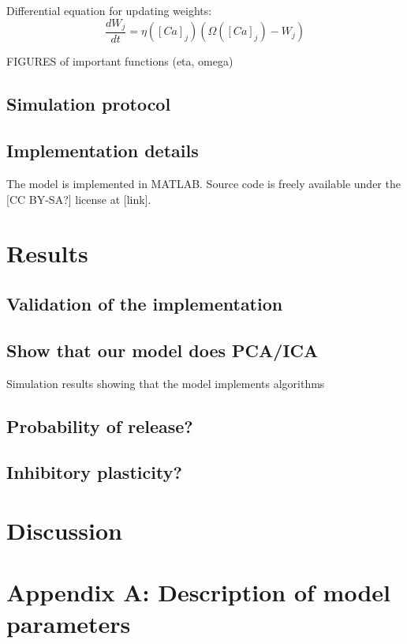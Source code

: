 \documentclass[a4paper,12pt]{report}
\theoremstyle{definition}
\begin{document}
Differential equation for updating weights: $$ \frac{dW_j}{dt} = \eta ([Ca]_j) (\Omega([Ca]_j) - W_j)$$

FIGURES of important functions (eta, omega)


\section{Simulation protocol}




\section{Implementation details}

The model is implemented in MATLAB. Source code is freely available under the [CC BY-SA?] license at [link].


\chapter{Results}
\section{Validation of the implementation}

\section{Show that our model does PCA/ICA}
Simulation results showing that the model implements algorithms

\section{Probability of release?}

\section{Inhibitory plasticity?}


\chapter{Discussion}



\chapter*{Appendix A: Description of model parameters}
\end{document}
